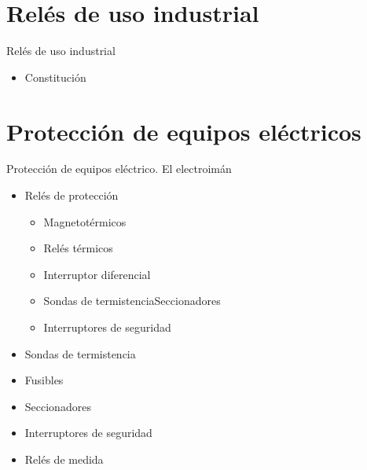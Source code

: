 \documentclass{beamer}
\begin{document}
\section{Relés de uso industrial}
\begin{frame}{Relés de uso industrial}
\begin{itemize}
    \item Constitución
\end{itemize}
\end{frame}


\section{Protección de equipos eléctricos}
\begin{frame}{Protección de equipos eléctrico. El electroimán}
    \begin{itemize}
        \item Relés de protección
        \begin{itemize}
            \item Magnetotérmicos
            \item Relés térmicos
            \item Interruptor diferencial
            \item Sondas de termistenciaSeccionadores
            \item Interruptores de seguridad
        \end{itemize}
        \item Sondas de termistencia
        \item Fusibles
        \item Seccionadores
        \item Interruptores de seguridad
        \item Relés de medida
    \end{itemize}

\end{frame}
\end{document}
